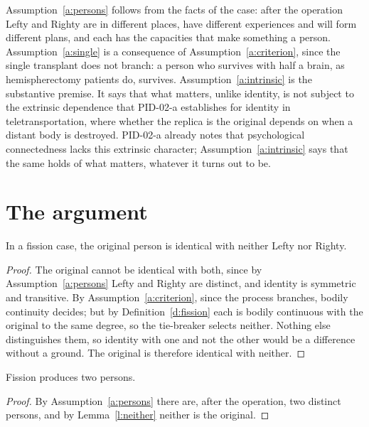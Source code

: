 \documentclass{situationist-preprint}
\begin{document}
Assumption~\ref{a:persons} follows from the facts of the case: after the operation Lefty and Righty are in different places, have different experiences and will form different plans, and each has the capacities that make something a person. Assumption~\ref{a:single} is a consequence of Assumption~\ref{a:criterion}, since the single transplant does not branch: a person who survives with half a brain, as hemispherectomy patients do, survives. Assumption~\ref{a:intrinsic} is the substantive premise. It says that what matters, unlike identity, is not subject to the extrinsic dependence that PID-02-a establishes for identity in teletransportation, where whether the replica is the original depends on when a distant body is destroyed. PID-02-a already notes that psychological connectedness lacks this extrinsic character; Assumption~\ref{a:intrinsic} says that the same holds of what matters, whatever it turns out to be.

\section{The argument}\label{s:arg}

\begin{lemma}\label{l:neither}
In a fission case, the original person is identical with neither Lefty nor Righty.
\end{lemma}

\begin{proof}
The original cannot be identical with both, since by Assumption~\ref{a:persons} Lefty and Righty are distinct, and identity is symmetric and transitive. By Assumption~\ref{a:criterion}, since the process branches, bodily continuity decides; but by Definition~\ref{d:fission} each is bodily continuous with the original to the same degree, so the tie-breaker selects neither. Nothing else distinguishes them, so identity with one and not the other would be a difference without a ground. The original is therefore identical with neither.
\end{proof}

\begin{theorem}\label{t:two}
Fission produces two persons.
\end{theorem}

\begin{proof}
By Assumption~\ref{a:persons} there are, after the operation, two distinct persons, and by Lemma~\ref{l:neither} neither is the original.
\end{proof}
\end{document}
